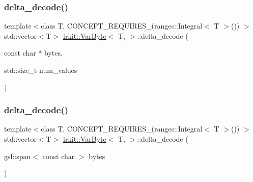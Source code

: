\subsubsection{\texorpdfstring{delta\+\_\+decode()}{delta\_decode()}\hspace{0.1cm}{\footnotesize\ttfamily [1/3]}}
{\footnotesize\ttfamily template$<$class T, C\+O\+N\+C\+E\+P\+T\+\_\+\+R\+E\+Q\+U\+I\+R\+E\+S\+\_\+(ranges\+::\+Integral$<$ T $>$()) $>$ \\
std\+::vector$<$T$>$ \mbox{\hyperlink{structirkit_1_1VarByte}{irkit\+::\+Var\+Byte}}$<$ T, $>$\+::delta\+\_\+decode (\begin{DoxyParamCaption}\item[{const char $\ast$}]{bytes,  }\item[{std\+::size\+\_\+t}]{num\+\_\+values }\end{DoxyParamCaption})\hspace{0.3cm}{\ttfamily [inline]}}

\mbox{\label{structirkit_1_1VarByte_a4f36c3ebab2071ebd9d47f4e3e4f3a42}} 
\subsubsection{\texorpdfstring{delta\+\_\+decode()}{delta\_decode()}\hspace{0.1cm}{\footnotesize\ttfamily [2/3]}}
{\footnotesize\ttfamily template$<$class T, C\+O\+N\+C\+E\+P\+T\+\_\+\+R\+E\+Q\+U\+I\+R\+E\+S\+\_\+(ranges\+::\+Integral$<$ T $>$()) $>$ \\
std\+::vector$<$T$>$ \mbox{\hyperlink{structirkit_1_1VarByte}{irkit\+::\+Var\+Byte}}$<$ T, $>$\+::delta\+\_\+decode (\begin{DoxyParamCaption}\item[{gsl\+::span$<$ const char $>$}]{bytes }\end{DoxyParamCaption})\hspace{0.3cm}{\ttfamily [inline]}}

\mbox{\label{structirkit_1_1VarByte_aefcc29aed7e2f454dadcc869eea99201}} 
